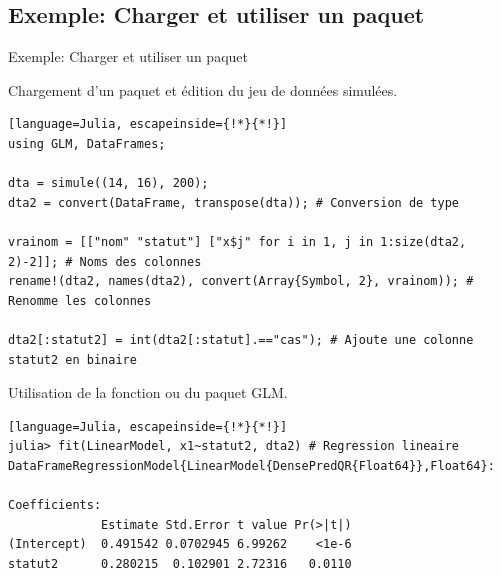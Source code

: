 \subsection{Exemple: Charger et utiliser un paquet}
\begin{frame}[containsverbatim]{\textcolor{goldenrod2}{Exemple:} Charger et utiliser un paquet}
\par{Chargement d'un paquet et édition du jeu de données simulées.}
\begin{lstlisting}[language=Julia, escapeinside={!*}{*!}]
using GLM, DataFrames;

dta = simule((14, 16), 200);
dta2 = convert(DataFrame, transpose(dta)); # Conversion de type

vrainom = [["nom" "statut"] ["x$j" for i in 1, j in 1:size(dta2, 2)-2]]; # Noms des colonnes
rename!(dta2, names(dta2), convert(Array{Symbol, 2}, vrainom)); # Renomme les colonnes

dta2[:statut2] = int(dta2[:statut].=="cas"); # Ajoute une colonne statut2 en binaire
\end{lstlisting}
\vspace{2ex}
\par{Utilisation de la fonction  ou  du paquet GLM.}
\begin{lstlisting}[language=Julia, escapeinside={!*}{*!}]
julia> fit(LinearModel, x1~statut2, dta2) # Regression lineaire
DataFrameRegressionModel{LinearModel{DensePredQR{Float64}},Float64}:

Coefficients:
             Estimate Std.Error t value Pr(>|t|)
(Intercept)  0.491542 0.0702945 6.99262    <1e-6
statut2      0.280215  0.102901 2.72316   0.0110
\end{lstlisting}
\end{frame}


